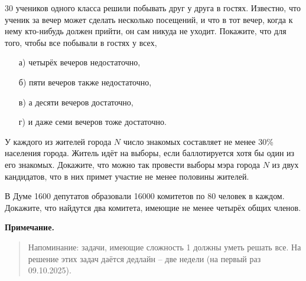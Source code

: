 \documentclass{article}
\begin{document}
\begin{task}[3]
30 учеников одного класса решили побывать друг у друга в гостях. Известно, что ученик за вечер может сделать несколько посещений, и что в тот вечер, когда к нему кто-нибудь должен прийти, он сам никуда не уходит. Покажите, что для того, чтобы все побывали в гостях у всех,
\begin{enumerate}
    \item[а)] четырёх вечеров недостаточно,
    \item[б)] пяти вечеров также недостаточно,
    \item[в)] а десяти вечеров достаточно,
    \item[г)] и даже семи вечеров тоже достаточно.
\end{enumerate}
\end{task}

\begin{task}[3]
У каждого из жителей города $N$ число знакомых составляет не менее 30\% населения города. Житель идёт на выборы, если баллотируется хотя бы один из его знакомых. Докажите, что можно так провести выборы мэра города $N$ из двух кандидатов, что в них примет участие не менее половины жителей.
\end{task}

\begin{task}[3]
В Думе 1600 депутатов образовали 16000 комитетов по 80 человек в каждом. Докажите, что найдутся два комитета, имеющие не менее четырёх общих членов.
\end{task}

\vspace{1.5em}
\noindent\textbf{Примечание.}
\begin{quote}
Напоминание: задачи, имеющие сложность 1 должны уметь решать все. На решение этих задач даётся дедлайн – две недели (на первый раз 09.10.2025).
\end{quote}
\end{document}
